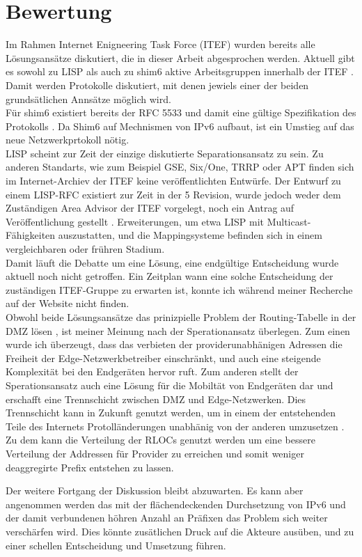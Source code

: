 \section{Bewertung}
Im Rahmen Internet Enigneering Task Force (ITEF) wurden bereits alle Lösungsansätze diskutiert, die in dieser Arbeit abgesprochen werden. Aktuell gibt es sowohl zu LISP als auch zu shim6 aktive Arbeitsgruppen innerhalb der ITEF \cite{ietf:groups}. Damit werden Protokolle diskutiert, mit denen jewiels einer der beiden grundsätlichen Annsätze möglich wird. \\

Für shim6 existiert bereits der RFC 5533 und damit eine gültige Spezifikation des Protokolls \cite{nordmark:2009:RFC5533} \cite{ietf:documents}. Da Shim6 auf Mechnismen von IPv6 aufbaut, ist ein Umstieg auf das neue Netzwerkprtokoll nötig. \\

LISP scheint zur Zeit der einzige diskutierte Separationsansatz zu sein. Zu anderen Standarts, wie zum Beispiel GSE, Six/One, TRRP oder APT finden sich im Internet-Archiev der ITEF keine veröffentlichten Entwürfe. Der Entwurf zu einem LISP-RFC \cite{farinacci:2009:LISP} existiert zur Zeit in der 5 Revision, wurde jedoch weder dem Zuständigen Area Advisor der ITEF vorgelegt, noch ein Antrag auf Veröffentlichung gestellt \cite{ietf:documents}. Erweiterungen, um etwa LISP mit Multicast-Fähigkeiten auszustatten, und die Mappingsysteme befinden sich in einem vergleichbaren oder frühren Stadium. \\

Damit läuft die Debatte um eine Lösung, eine endgültige Entscheidung wurde aktuell noch nicht getroffen. Ein Zeitplan wann eine solche Entscheidung der zuständigen ITEF-Gruppe zu erwarten ist, konnte ich während meiner Recherche auf der Website nicht finden. \\

Obwohl beide Lösungsansätze das prinizpielle Problem der Routing-Tabelle in der DMZ lösen \cite{jen:2008:start}, ist meiner Meinung nach der Sperationansatz überlegen. Zum einen wurde ich überzeugt, dass das verbieten der providerunabhänigen Adressen die Freiheit der Edge-Netzwerkbetreiber einschränkt, und auch eine steigende Komplexität bei den Endgeräten hervor ruft. Zum anderen stellt der Sperationsansatz auch eine Lösung für die Mobiltät von Endgeräten dar und erschafft eine Trennschicht zwischen DMZ und Edge-Netzwerken. Dies Trennschicht kann in Zukunft genutzt werden, um in einem der entstehenden Teile des Internets Protolländerungen unabhänig von der anderen umzusetzen \cite{jen:2008:start}. Zu dem kann die Verteilung der RLOCs genutzt werden um eine bessere Verteilung der Addressen für Provider zu erreichen und somit weniger deaggregirte Prefix entstehen zu lassen.

Der weitere Fortgang der Diskussion bleibt abzuwarten. Es kann aber angenommen werden das mit der flächendeckenden Durchsetzung von IPv6 und der damit verbundenen höhren Anzahl an Präfixen das Problem sich weiter verschärfen wird. Dies könnte zusätlichen Druck auf die Akteure ausüben, und zu einer schellen Entscheidung und Umsetzung führen.



